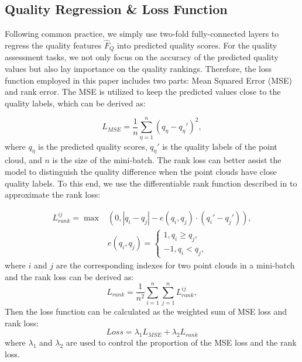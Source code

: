 \documentclass{article}
\begin{document}
\subsection{Quality Regression \& Loss Function}
Following common practice, we simply use two-fold fully-connected layers to regress the quality features $\hat{F}_{Q}$ into predicted quality scores.
For the quality assessment tasks, we not only focus on the accuracy of the predicted quality values but also lay importance on the quality rankings. Therefore, the loss function employed in this paper includes two parts: Mean Squared Error (MSE) and rank error. The MSE is utilized to keep the predicted values close to the quality labels, which can be derived as:

\begin{equation}
    L_{MSE} = \frac{1}{n} \sum_{\eta=1}^{n} (q_{\eta}-q_{\eta}')^2,
\end{equation}
where $q_{\eta}$ is the predicted quality scores, $q_{\eta}'$ is the quality labels of the point cloud, and $n$ is the size of the mini-batch. The rank loss can better assist the model to distinguish the quality difference when the point clouds have close quality labels. To this end, we use the differentiable rank function described in \cite{sun2022deep} to approximate the rank loss:

\begin{equation}
\begin{aligned}
    L_{rank }^{i j}\!=\!\max\! &\left(0,\left|q_{i}-q_{j}\right|\!-\!e\left(q_{i}, q_{j}\right)\! \cdot\! \left({q}_{i}'-{q}_{j}'\right)\right), \\
    &e\left(q_{i}, q_{j}\right)=\left\{\begin{array}{r}
1, q_{i} \geq q_{j}, \\
-1, q_{i}<q_{j},
\end{array}\right.
\end{aligned}
\end{equation}
where $i$ and $j$ are the corresponding indexes for two point clouds in a mini-batch and the rank loss can be derived as:
\begin{equation}
    L_{r a n k}=\frac{1}{n^{2}} \sum_{i=1}^{n} \sum_{j=1}^{n} L_{r a n k}^{i j},
\end{equation}
Then the loss function can be calculated as the weighted sum of MSE loss and rank loss:
\begin{equation}
    Loss=\lambda_{1}L_{MSE}+\lambda_{2} L_{r a n k}
\end{equation}
where $\lambda_{1}$ and $\lambda_{2}$ are used to control the proportion of the MSE loss and the rank loss.
\end{document}
